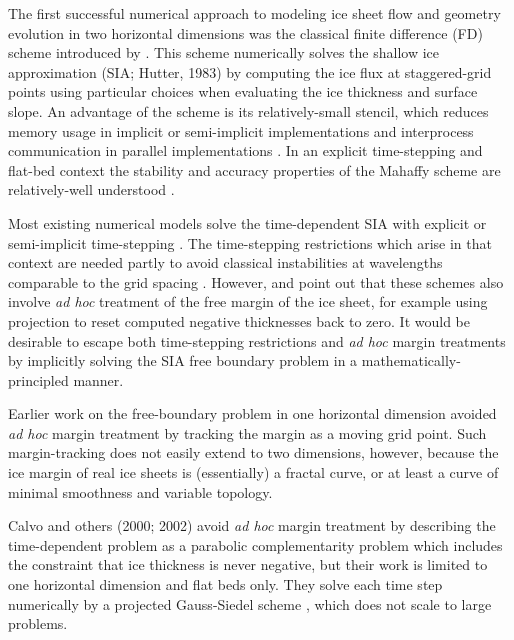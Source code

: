 \documentclass[twocolumn,letterpaper]{igs}
\begin{document}
The first successful numerical approach to modeling ice sheet flow and geometry evolution in two horizontal dimensions was the classical finite difference (FD) scheme introduced by \cite{Mahaffy1976}.  This scheme numerically solves the shallow ice approximation (SIA; Hutter, 1983)\nocite{Hutter1983} by computing the ice flux at staggered-grid points using particular choices when evaluating the ice thickness and surface slope.  An advantage of the scheme is its relatively-small stencil, which reduces memory usage in implicit or semi-implicit implementations \citep{HindmarshPayne1996} and interprocess communication in parallel implementations \citep{Bueleretal2007}.  In an explicit time-stepping and flat-bed context the stability and accuracy properties of the Mahaffy scheme are relatively-well understood \citep{Bueleretal2005,HindmarshPayne1996}.

Most existing numerical models solve the time-dependent SIA with explicit or semi-implicit time-stepping  \citep{Bueleretal2005,EgholmNielsen2010,HindmarshPayne1996,Huybrechtsetal1996,JaroschSchoofAnslow2013}.  The time-stepping restrictions which arise in that context are needed partly to avoid classical instabilities at wavelengths comparable to the grid spacing \citep{MortonMayers2005}.  However, \cite{Bueleretal2005} and \cite{JaroschSchoofAnslow2013} point out that these schemes also involve \emph{ad hoc} treatment of the free margin of the ice sheet, for example using projection to reset computed negative thicknesses back to zero.  It would be desirable to escape both time-stepping restrictions and \emph{ad hoc} margin treatments by implicitly solving the SIA free boundary problem in a mathematically-principled manner.

Earlier work on the free-boundary problem in one horizontal dimension \citep{Hindmarshetal1987,HindmarshHutter1988} avoided \emph{ad hoc} margin treatment by tracking the margin as a moving grid point.  Such margin-tracking does not easily extend to two dimensions, however, because the ice margin of real ice sheets is (essentially) a fractal curve, or at least a curve of minimal smoothness and variable topology.

Calvo and others (2000; 2002)\nocite{CalvoDuranyVazquez2000,Calvoetal2002} avoid \emph{ad hoc} margin treatment by describing the time-dependent problem as a parabolic complementarity problem which includes the constraint that ice thickness is never negative, but their work is limited to one horizontal dimension and flat beds only.  They solve each time step numerically by a projected Gauss-Siedel scheme \citep{Ciarlet2002}, which does not scale to large problems.  
\end{document}
